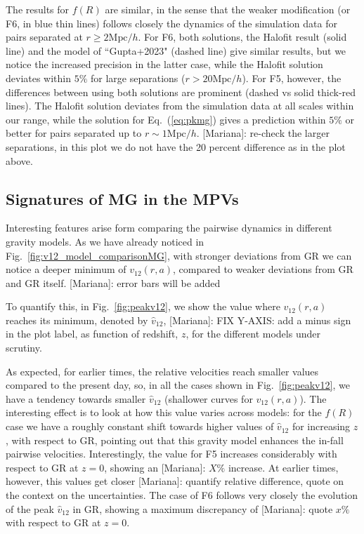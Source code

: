\documentclass[%
 reprint,
groupedaddress,
nofootinbib,
nobibnotes,
 amsmath,amssymb,
 aps,
]{revtex4-2}
\newcommand{\refeq}[1]{Eq.~(\ref{eq:#1})}
\newcommand{\reffig}[1]{Fig.~\ref{fig:#1}}
\newcommand{\pairvel}{$v_{12}(r,a)$}
\newcommand{\MpchInv}{$\mbox{Mpc}/h$}
\newcommand{\<}{\langle}
\renewcommand{\>}{\rangle}
\newcommand{\MJ}[1]{\textcolor{WildStrawberry}{[Mariana]: #1}}
\begin{document}
The results for $f(R)$ are similar, in the sense that the weaker modification (or F6, in blue thin lines) follows closely the dynamics of the simulation data for pairs separated at $r \geq2$\MpchInv. For F6, both solutions, the Halofit result (solid line) and the model of ``Gupta+2023" (dashed line)  give similar results, but we notice the increased precision in the latter case, while the Halofit solution deviates within $5\%$ for large separations ($r>20$\MpchInv). For F5, however, the differences between using both solutions are prominent (dashed vs solid thick-red lines). The Halofit solution deviates from the simulation data at all scales within our range, while the solution for \refeq{pkmg} gives a prediction within $5\%$ or better for pairs separated up to $r\sim1$\MpchInv. \MJ{re-check the larger separations, in this plot we do not have the 20 percent difference as in the plot above}.


\subsection{\label{subsec:mgsignatures} Signatures of MG in the MPVs}

Interesting features arise form comparing the pairwise dynamics in different gravity models. As we have already noticed in \reffig{v12_model_comparisonMG}, with stronger deviations from GR we can notice a deeper minimum of \pairvel{}, compared to weaker deviations from GR and GR itself. \MJ{error bars will be added}

To quantify this, in \reffig{peakv12}, we show the value where \pairvel{} reaches its minimum, denoted by  $\hat{v}_{12}$, \MJ{FIX Y-AXIS: add a minus sign in the plot label}, as function of redshift, $z$, for the different models under scrutiny. 

As expected, for earlier times, the relative velocities reach smaller values compared to the present day, so, in all the cases shown in \reffig{peakv12}, we have a tendency towards smaller $\hat{v}_{12}$ (shallower curves for \pairvel{}). The interesting effect is to look at how this value varies across models: for the $f(R)$ case we have a roughly constant shift towards higher values of $\hat{v}_{12}$ for increasing $z$, with respect to GR, pointing out that this gravity model enhances the in-fall pairwise velocities.  Interestingly, the value for F5 increases considerably with respect to GR at $z=0$, showing an \MJ{$X\%$ increase}. At earlier times, however, this values get closer \MJ{quantify relative difference, quote on the context on the uncertainties}. The case of F6 follows very closely the evolution of the peak  $\hat{v}_{12}$ in GR, showing a maximum discrepancy of \MJ{quote $x\%$ } with respect to GR at $z=0$.
\end{document}
